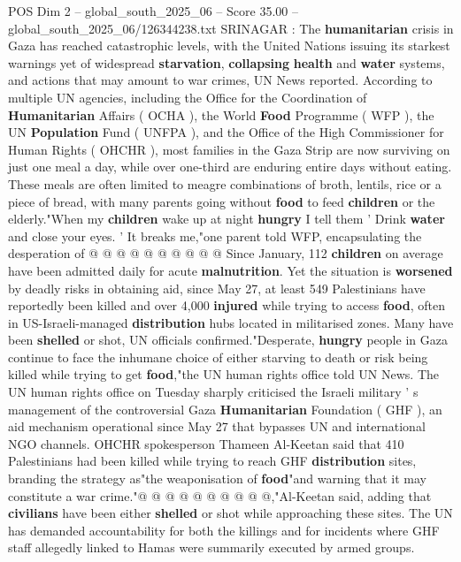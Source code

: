 \begin{textsample}{POS Dim 2 – global\_south\_2025\_06 – Score 35.00 – global\_south\_2025\_06/126344238.txt}  \label{ex:f2_pos_082}
SRINAGAR : The \textbf{humanitarian} crisis in Gaza has reached catastrophic levels, with the United Nations issuing its starkest warnings yet of widespread \textbf{starvation}, \textbf{collapsing} \textbf{health} and \textbf{water} systems, and actions that may amount to war crimes, UN News reported.
According to multiple UN agencies, including the Office for the Coordination of \textbf{Humanitarian} Affairs ( OCHA ), the World \textbf{Food} Programme ( WFP ), the UN \textbf{Population} Fund ( UNFPA ), and the Office of the High Commissioner for Human Rights ( OHCHR ), most families in the Gaza Strip are now surviving on just one meal a day, while over one-third are enduring entire days without eating.
These meals are often limited to meagre combinations of broth, lentils, rice or a piece of bread, with many parents going without \textbf{food} to feed \textbf{children} or the elderly."When my \textbf{children} wake up at night \textbf{hungry} I tell them ' Drink \textbf{water} and close your eyes. ' It breaks me,"one parent told WFP, encapsulating the desperation of @ @ @ @ @ @ @ @ @ @ Since January, 112 \textbf{children} on average have been admitted daily for acute \textbf{malnutrition}.
Yet the situation is \textbf{worsened} by deadly risks in obtaining aid, since May 27, at least 549 Palestinians have reportedly been killed and over 4,000 \textbf{injured} while trying to access \textbf{food}, often in US-Israeli-managed \textbf{distribution} hubs located in militarised zones.
Many have been \textbf{shelled} or shot, UN officials confirmed."Desperate, \textbf{hungry} people in Gaza continue to face the inhumane choice of either starving to death or risk being killed while trying to get \textbf{food},"the UN human rights office told UN News.
The UN human rights office on Tuesday sharply criticised the Israeli military ' s management of the controversial Gaza \textbf{Humanitarian} Foundation ( GHF ), an aid mechanism operational since May 27 that bypasses UN and international NGO channels.
OHCHR spokesperson Thameen Al-Keetan said that 410 Palestinians had been killed while trying to reach GHF \textbf{distribution} sites, branding the strategy as"the weaponisation of \textbf{food}"and warning that it may constitute a war crime."@ @ @ @ @ @ @ @ @ @,"Al-Keetan said, adding that \textbf{civilians} have been either \textbf{shelled} or shot while approaching these sites.
The UN has demanded accountability for both the killings and for incidents where GHF staff allegedly linked to Hamas were summarily executed by armed groups.

\end{textsample}
